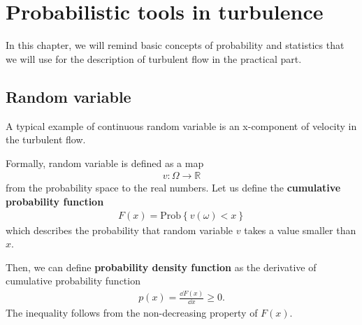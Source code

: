 \chapter{Probabilistic tools in turbulence}
In this chapter, we will remind basic concepts of probability and statistics \cite{turb} that we will use for the description of turbulent flow in the practical part.


%
%
%
%
%
%
%
\section{Random variable}
A typical example of continuous random variable is an x-component of velocity in the turbulent flow.

Formally, random variable is defined as a map
\begin{align}
v: \Omega \rightarrow \mathbb{R}
\end{align}
from the probability space to the real numbers.
%
Let us define the \textbf{cumulative probability function}
\begin{align}
F(x) = \mathrm{Prob}\left\{v(\omega) < x\right\}
\end{align}
which describes the probability that random variable $v$ takes a value smaller than $x$. 

Then, we can define \textbf{probability density function} as the derivative of cumulative probability function
\begin{align}
p(x) = \frac{\dd F(x)}{\dd x} \geq 0.
\end{align}
The inequality follows from the non-decreasing property of $F(x)$. 

